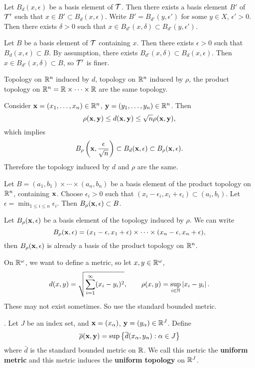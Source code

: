 \pf \\
\note{\mimp} Let \(B_d(x, \epsilon)\) be a basis element of \(\mc{T}\). Then there exists a basis element \(B'\) of \(\mc{T}'\) such that \(x \in B' \subset B_d(x, \epsilon)\). Write \(B' = B_{d'}(y, \epsilon')\) for some \(y \in X\), \(\epsilon' > 0\). Then there exists \(\delta > 0\) such that \(x \in B_{d'}(x, \delta) \subset B_{d'}(y, \epsilon')\).

\note{\mimpd} Let \(B\) be a basis element of \(\mc{T}\) containing \(x\). Then there exists \(\epsilon > 0\) such that \(B_d(x, \epsilon) \subset B\). By assumption, there exists \(B_{d'}(x, \delta) \subset B_d(x, \epsilon)\). Then \(x \in B_{d'}(x, \delta) \subset B\), so \(\mc{T}'\) is finer.

 Topology on \(\R^n\) induced by \(d\), topology on \(\R^n\) induced by \(\rho\), the product topology on \(\R^n = \R\times \cdots \times \R\) are the same topology.

\pf Consider \(\bf{x} = (x_1, \dots, x_n) \in \R^n\), \(\bf{y} = (y_1, \dots, y_n) \in \R^n\). Then
\[
    \rho(\bf{x}, \bf{y}) \leq d(\bf{x}, \bf{y}) \leq \sqrt{n}\rho(\bf{x}, \bf{y}),
\]
which implies
\[
    B_\rho\paren{\bf{x}, \frac{\epsilon}{\sqrt{n}}} \subset B_d(\bf{x}, \epsilon) \subset B_\rho(\bf{x}, \epsilon).
\]
Therefore the topology induced by \(d\) and \(\rho\) are the same.

\note{\(\supset\)} Let \(B = (a_1, b_1) \times \cdots \times (a_n, b_n)\) be a basis element of the product topology on \(\R^n\), containing \(\bf{x}\). Choose \(\epsilon_i > 0\) such that \((x_i - \epsilon_i, x_i + \epsilon_i) \subset (a_i, b_i)\). Let \(\epsilon = \min_{1\leq i \leq n} \epsilon_i\). Then \(B_\rho(\bf{x}, \epsilon) \subset B\).

\note{\(\subset\)} Let \(B_\rho(\bf{x}, \epsilon)\) be a basis element of the topology induced by \(\rho\). We can write
\[
    B_\rho(\bf{x}, \epsilon) = (x_1 - \epsilon, x_1 + \epsilon) \times \cdots \times (x_n - \epsilon, x_n + \epsilon),
\]
then \(B_\rho(\bf{x}, \epsilon)\) is already a basis of the product topology on \(\R^n\).

On \(\R^\omega\), we want to define a metric, so let \(x, y \in \R^\omega\),
\[
    d(x, y) = \sqrt{\sum_{i=1}^{\infty} (x_i - y_i)^2}, \qquad \rho(x, y) = \sup_{i \in \N} \abs{x_i - y_i}.
\]
These may not exist sometimes. So use the standard bounded metric.

. Let \(J\) be an index set, and \(\bf{x} = (x_\alpha)\), \(\bf{y} = (y_\alpha) \in \R^J\). Define
\[
    \bar{\rho}(\bf{x}, \bf{y}) = \sup\left\{\bar{d}(x_\alpha, y_\alpha) : \alpha \in J\right\}
\]
where \(\bar{d}\) is the standard bounded metric on \(\R\). We call this metric the \textbf{uniform metric} and this metric induces the \textbf{uniform topology} on \(\R^J\).

